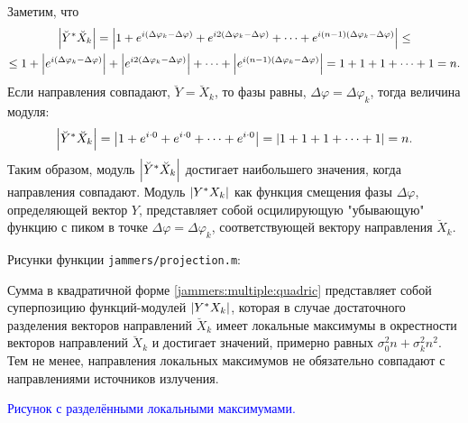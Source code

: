 Заметим, что
\begin{multline*}
    \left | \breve{Y}^* \breve{X}_k \right |
    = \left | 1 + e^{i (\Delta \varphi_k - \Delta \varphi )} + e^{i 2 (\Delta \varphi_k - \Delta \varphi )} + \dots + e^{i (n-1) (\Delta \varphi_k - \Delta \varphi )} \right | \le \\
    \le 1 + \left | e^{i (\Delta \varphi_k - \Delta \varphi )} \right | + \left | e^{i 2 (\Delta \varphi_k - \Delta \varphi )} \right | + \dots + \left | e^{i (n-1) (\Delta \varphi_k - \Delta \varphi )} \right |
    = 1 + 1 + 1 + \dots + 1
    = n .
\end{multline*}
Если направления совпадают, $\breve{Y} = \breve{X}_k$, то фазы равны, $\Delta \varphi = \Delta \varphi_k$, тогда величина модуля:
\[
    \left | \breve{Y}^* \breve{X}_k \right |
    = \left | 1 + e^{i \cdot 0} + e^{i \cdot 0} + \dots + e^{i \cdot 0} \right |
    = \left | 1 + 1 + 1 + \dots + 1 \right |
    = n .
\]
Таким образом, модуль $\left | \breve{Y}^* \breve{X}_k \right |$ достигает наибольшего значения, когда направления совпадают. Модуль $\left | Y^* X_k \right |$ как функция смещения фазы
$\Delta \varphi$, определяющей вектор $Y$, представляет собой осцилирующую "убывающую"{} функцию с пиком в точке $\Delta \varphi = \Delta \varphi_k$, соответствующей вектору
направления $\breve{X}_k$.

Рисунки функции \texttt{jammers/projection.m}:
\begin{Matlab}
\end{Matlab}

Сумма в квадратичной форме \eqref{jammers:multiple:quadric} представляет собой суперпозицию функций-модулей $\left | Y^* X_k \right |$, которая в случае достаточного разделения векторов
направлений $\breve{X}_k$ имеет локальные максимумы в окрестности векторов направлений $\breve{X}_k$ и достигает значений, примерно равных $\sigma_0^2 n + \sigma_k^2 n^2$. Тем не менее,
направления локальных максимумов не обязательно совпадают с направлениями источников излучения.

\begin{Matlab}
\end{Matlab}
\textcolor{blue}{Рисунок с разделёнными локальными максимумами.}

